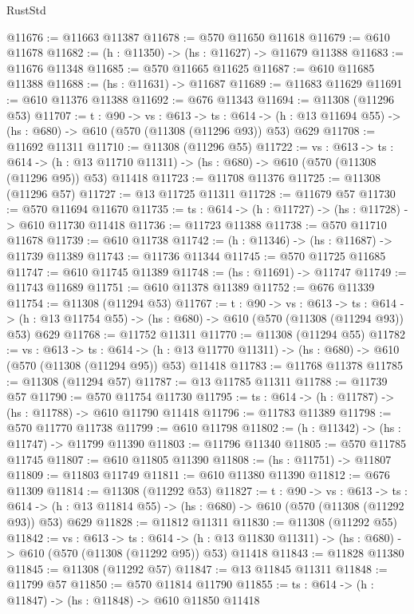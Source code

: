 \begin{lexlean}{RustStd}
\begin{coremodule}
@11676 := @11663 @11387
@11678 := @570 @11650 @11618
@11679 := @610 @11678
@11682 := (h : @11350) -> (hs : @11627) -> @11679 @11388
@11683 := @11676 @11348
@11685 := @570 @11665 @11625
@11687 := @610 @11685 @11388
@11688 := (hs : @11631) -> @11687
@11689 := @11683 @11629
@11691 := @610 @11376 @11388
@11692 := @676 @11343
@11694 := @11308 (@11296 @53)
@11707 := {t : @90} ->
  {vs : @613} ->
  {ts : @614} -> (h : @13 @11694 @55) -> (hs : @680) -> @610 (@570 (@11308 (@11296 @93)) @53) @629
@11708 := @11692 @11311
@11710 := @11308 (@11296 @55)
@11722 := {vs : @613} ->
  {ts : @614} ->
  (h : @13 @11710 @11311) -> (hs : @680) -> @610 (@570 (@11308 (@11296 @95)) @53) @11418
@11723 := @11708 @11376
@11725 := @11308 (@11296 @57)
@11727 := @13 @11725 @11311
@11728 := @11679 @57
@11730 := @570 @11694 @11670
@11735 := {ts : @614} -> (h : @11727) -> (hs : @11728) -> @610 @11730 @11418
@11736 := @11723 @11388
@11738 := @570 @11710 @11678
@11739 := @610 @11738
@11742 := (h : @11346) -> (hs : @11687) -> @11739 @11389
@11743 := @11736 @11344
@11745 := @570 @11725 @11685
@11747 := @610 @11745 @11389
@11748 := (hs : @11691) -> @11747
@11749 := @11743 @11689
@11751 := @610 @11378 @11389
@11752 := @676 @11339
@11754 := @11308 (@11294 @53)
@11767 := {t : @90} ->
  {vs : @613} ->
  {ts : @614} -> (h : @13 @11754 @55) -> (hs : @680) -> @610 (@570 (@11308 (@11294 @93)) @53) @629
@11768 := @11752 @11311
@11770 := @11308 (@11294 @55)
@11782 := {vs : @613} ->
  {ts : @614} ->
  (h : @13 @11770 @11311) -> (hs : @680) -> @610 (@570 (@11308 (@11294 @95)) @53) @11418
@11783 := @11768 @11378
@11785 := @11308 (@11294 @57)
@11787 := @13 @11785 @11311
@11788 := @11739 @57
@11790 := @570 @11754 @11730
@11795 := {ts : @614} -> (h : @11787) -> (hs : @11788) -> @610 @11790 @11418
@11796 := @11783 @11389
@11798 := @570 @11770 @11738
@11799 := @610 @11798
@11802 := (h : @11342) -> (hs : @11747) -> @11799 @11390
@11803 := @11796 @11340
@11805 := @570 @11785 @11745
@11807 := @610 @11805 @11390
@11808 := (hs : @11751) -> @11807
@11809 := @11803 @11749
@11811 := @610 @11380 @11390
@11812 := @676 @11309
@11814 := @11308 (@11292 @53)
@11827 := {t : @90} ->
  {vs : @613} ->
  {ts : @614} -> (h : @13 @11814 @55) -> (hs : @680) -> @610 (@570 (@11308 (@11292 @93)) @53) @629
@11828 := @11812 @11311
@11830 := @11308 (@11292 @55)
@11842 := {vs : @613} ->
  {ts : @614} ->
  (h : @13 @11830 @11311) -> (hs : @680) -> @610 (@570 (@11308 (@11292 @95)) @53) @11418
@11843 := @11828 @11380
@11845 := @11308 (@11292 @57)
@11847 := @13 @11845 @11311
@11848 := @11799 @57
@11850 := @570 @11814 @11790
@11855 := {ts : @614} -> (h : @11847) -> (hs : @11848) -> @610 @11850 @11418

\end{coremodule}
\end{lexlean}
